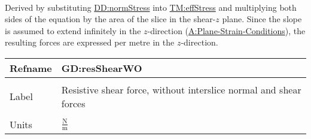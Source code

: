 \documentclass[12pt]{article}
\begin{document}
\paragraph{}
\label{GD:effNormFDeriv}
Derived by substituting \hyperref[DD:normStress]{DD:normStress} into \hyperref[TM:effStress]{TM:effStress} and multiplying both sides of the equation by the area of the slice in the shear-$z$ plane. Since the slope is assumed to extend infinitely in the $z$-direction (\hyperref[assumpPSC]{A:Plane-Strain-Conditions}), the resulting forces are expressed per metre in the $z$-direction.

\vspace{\baselineskip}
\noindent
\begin{minipage}{\textwidth}
\begin{tabular}{>{\raggedright}p{}>{\raggedright\arraybackslash}p{}}
\toprule \textbf{Refname} & \textbf{GD:resShearWO}
\label{GD:resShearWO}
\\ \midrule \\
Label & Resistive shear force, without interslice normal and shear forces
        
\\ \midrule \\
Units & $\frac{\text{N}}{\text{m}}$
        

\end{tabular}
\end{minipage}
\end{document}
